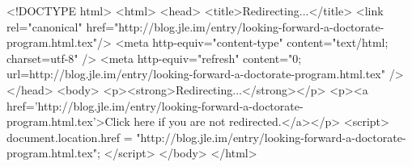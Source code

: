 <!DOCTYPE html>
<html>
<head>
<title>Redirecting...</title>
<link rel="canonical" href="http://blog.jle.im/entry/looking-forward-a-doctorate-program.html.tex"/>
<meta http-equiv="content-type" content="text/html; charset=utf-8" />
<meta http-equiv="refresh" content="0; url=http://blog.jle.im/entry/looking-forward-a-doctorate-program.html.tex" />
</head>
<body>
  <p><strong>Redirecting...</strong></p>
  <p><a href='http://blog.jle.im/entry/looking-forward-a-doctorate-program.html.tex'>Click here if you are not redirected.</a></p>
  <script>
    document.location.href = "http://blog.jle.im/entry/looking-forward-a-doctorate-program.html.tex";
  </script>
</body>
</html>
